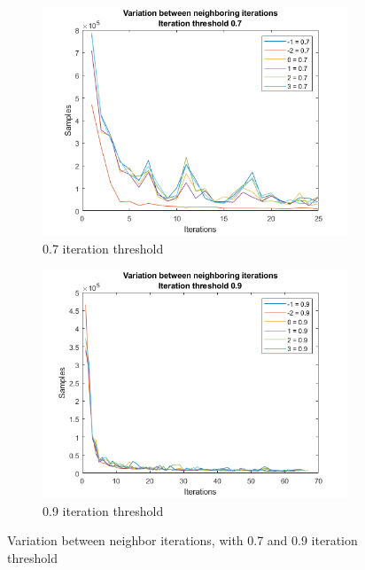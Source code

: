 \begin{figure}
    \centering
    \begin{subfigure}[b]{.45\textwidth}
        \centering
        \includegraphics[width=\textwidth]{figures/varneigh-0.7.png}
        \caption{0.7 iteration threshold}
        \label{sfig:iter:varneigh0.7}
    \end{subfigure}
    \hfill
    \begin{subfigure}[b]{.45\textwidth}
        \centering
        \includegraphics[width=\textwidth]{figures/varneigh-0.9.png}
        \caption{0.9 iteration threshold}
        \label{sfig:iter:varneigh0.9}
    \end{subfigure}
    \caption{Variation between neighbor iterations, with 0.7 and 0.9 iteration threshold}
    \label{fig:iter:varneigh0.70.9}
\end{figure}

